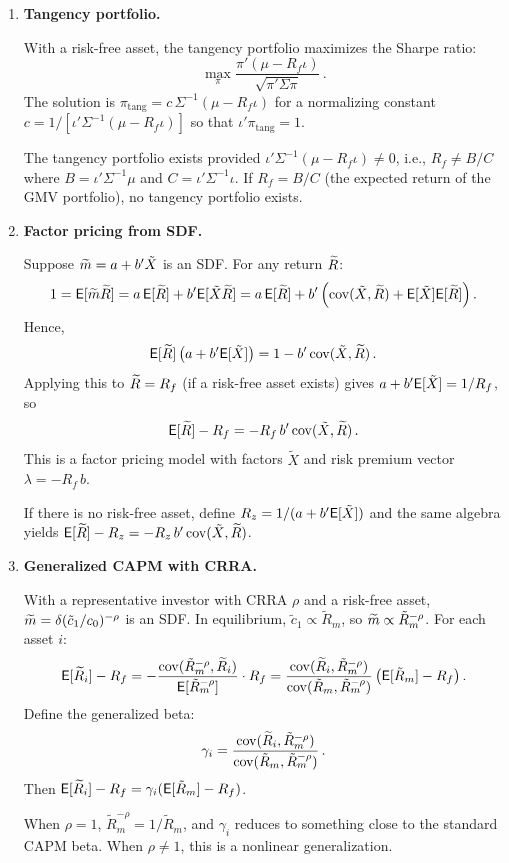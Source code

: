 \begin{enumerate}
\item \textbf{Tangency portfolio.}

With a risk-free asset, the tangency portfolio maximizes the Sharpe ratio:
\[
\max_\pi \frac{\pi'(\mu-R_f\iota)}{\sqrt{\pi'\Sigma\pi}}\,.
\]
The solution is $\pi_{\mathrm{tang}} = c\,\Sigma^{-1}(\mu-R_f\iota)$ for a normalizing constant $c = 1/[\iota'\Sigma^{-1}(\mu-R_f\iota)]$ so that $\iota'\pi_{\mathrm{tang}}=1$.

The tangency portfolio exists provided $\iota'\Sigma^{-1}(\mu - R_f\iota) \neq 0$, i.e., $R_f \neq B/C$ where $B = \iota'\Sigma^{-1}\mu$ and $C = \iota'\Sigma^{-1}\iota$.  If $R_f = B/C$ (the expected return of the GMV portfolio), no tangency portfolio exists.

\item \textbf{Factor pricing from SDF.}

Suppose $\widetilde{m} = a + b'\tilde{X}$ is an SDF.  For any return $\widetilde{R}$:
\[
1 = \mathsf{E}[\widetilde{m}\widetilde{R}] = a\,\mathsf{E}[\widetilde{R}] + b'\mathsf{E}[\tilde{X}\widetilde{R}] = a\,\mathsf{E}[\widetilde{R}] + b'\left(\operatorname{cov}(\tilde{X},\widetilde{R}) + \mathsf{E}[\tilde{X}]\mathsf{E}[\widetilde{R}]\right).
\]
Hence,
\[
\mathsf{E}[\widetilde{R}]\left(a + b'\mathsf{E}[\tilde{X}]\right) = 1 - b'\operatorname{cov}(\tilde{X},\widetilde{R})\,.
\]
Applying this to $\widetilde{R} = R_f$ (if a risk-free asset exists) gives $a + b'\mathsf{E}[\tilde{X}] = 1/R_f$, so
\[
\mathsf{E}[\widetilde{R}] - R_f = -R_f\,b'\operatorname{cov}(\tilde{X},\widetilde{R})\,.
\]
This is a factor pricing model with factors $\tilde{X}$ and risk premium vector $\lambda = -R_f\,b$.

If there is no risk-free asset, define $R_z = 1/(a+b'\mathsf{E}[\tilde{X}])$ and the same algebra yields $\mathsf{E}[\widetilde{R}] - R_z = -R_z\,b'\operatorname{cov}(\tilde{X},\widetilde{R})$.

\item \textbf{Generalized CAPM with CRRA.}

With a representative investor with CRRA $\rho$ and a risk-free asset, $\widetilde{m} = \delta(\tilde{c}_1/c_0)^{-\rho}$ is an SDF.  In equilibrium, $\tilde{c}_1 \propto \tilde{R}_m$, so $\widetilde{m} \propto \tilde{R}_m^{-\rho}$.  For each asset $i$:
\[
\mathsf{E}[\widetilde{R}_i] - R_f = -\frac{\operatorname{cov}(\tilde{R}_m^{-\rho},\widetilde{R}_i)}{\mathsf{E}[\tilde{R}_m^{-\rho}]}\cdot R_f = \frac{\operatorname{cov}(\widetilde{R}_i,\tilde{R}_m^{-\rho})}{\operatorname{cov}(\tilde{R}_m,\tilde{R}_m^{-\rho})}\left(\mathsf{E}[\tilde{R}_m]-R_f\right).
\]
Define the generalized beta:
\[
\gamma_i = \frac{\operatorname{cov}(\widetilde{R}_i,\tilde{R}_m^{-\rho})}{\operatorname{cov}(\tilde{R}_m,\tilde{R}_m^{-\rho})}\,.
\]
Then $\mathsf{E}[\widetilde{R}_i]-R_f = \gamma_i(\mathsf{E}[\tilde{R}_m]-R_f)$.

When $\rho=1$, $\tilde{R}_m^{-\rho} = 1/\tilde{R}_m$, and $\gamma_i$ reduces to something close to the standard CAPM beta.  When $\rho \neq 1$, this is a nonlinear generalization.


\end{enumerate}
